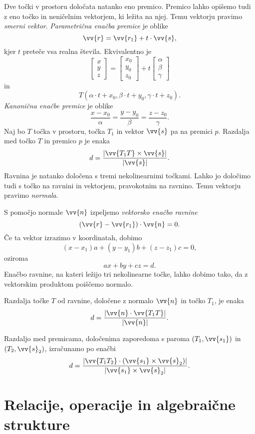 \documentclass[12pt, a4paper]{article}
\begin{document}
Dve točki v prostoru določata natanko eno premico. Premico lahko opišemo tudi z eno točko in neničelnim vektorjem, ki ležita na njej. Temu vektorju pravimo \emph{smerni vektor}. \emph{Parametrična enačba premice} je oblike
\[
\vv{r}=\vv{r_1}+t\cdot\vv{s},
\]
kjer $t$ preteče vsa realna števila. Ekvivalentno je
\[
\begin{bmatrix}
x \\
y \\
z
\end{bmatrix}
=
\begin{bmatrix}
x_0 \\
y_0 \\
z_0
\end{bmatrix}
+t\begin{bmatrix}
\alpha \\
\beta \\
\gamma
\end{bmatrix}
\]
in
\[
T(\alpha\cdot t+x_0,\beta\cdot t+y_0,\gamma\cdot t+z_0).
\]
\emph{Kanonična enačbe premice} je oblike
\[
\frac{x-x_0}{\alpha}=\frac{y-y_0}{\beta}=\frac{z-z_0}{\gamma}.
\]
Naj bo $T$ točka v prostoru, točka $T_1$ in vektor $\vv{s}$ pa na premici $p$. Razdalja med točko $T$ in premico $p$ je enaka
\[
d=\frac{\left|\vv{T_1T}\times\vv{s}\right|}{\left|\vv{s}\right|}.
\]
Ravnina je natanko določena s tremi nekolinearnimi točkami. Lahko jo določimo tudi s točko na ravnini in vektorjem, pravokotnim na ravnino. Temu vektorju pravimo \emph{normala}.

S pomočjo normale $\vv{n}$ izpeljemo \emph{vektorsko enačbo ravnine}
\[
(\vv{r}-\vv{r_1})\cdot\vv{n}=0.
\]
Če ta vektor izrazimo v koordinatah, dobimo
\[
(x-x_1)a+(y-y_1)b+(z-z_1)c=0,
\]
oziroma
\[
ax+by+cz=d.
\]
Enačbo ravnine, na kateri ležijo tri nekolinearne točke, lahko dobimo tako, da z vektorskim produktom poiščemo normalo.

Razdalja točke $T$ od ravnine, določene z normalo $\vv{n}$ in točko $T_1$, je enaka
\[
d=\frac{\left|\vv{n}\cdot\vv{T_1T}\right|}{\left|\vv{n}\right|}.
\]

Razdaljo med premicama, določenima zaporedoma s paroma $(T_1,\vv{s_1})$ in $(T_2,\vv{s}_2)$, izračunamo po enačbi
\[
d=\frac{\left|\vv{T_1T_2}\cdot(\vv{s_1}\times\vv{s}_2)\right|}{\left|\vv{s_1}\times\vv{s}_2\right|}.
\]

\newpage

\section{Relacije, operacije in algebraične strukture}
\end{document}
